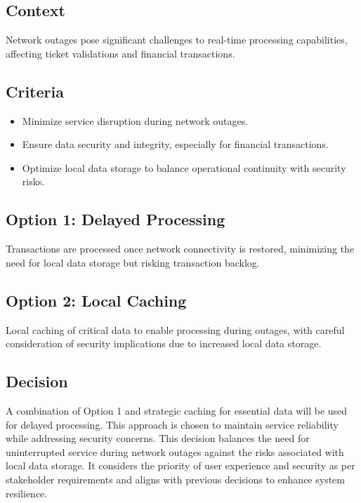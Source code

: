 \subsection*{Context}
Network outages pose significant challenges to real-time processing capabilities, affecting ticket validations and financial transactions.

\subsection*{Criteria}
\begin{itemize}
    \item Minimize service disruption during network outages.
    \item Ensure data security and integrity, especially for financial transactions.
    \item Optimize local data storage to balance operational continuity with security risks.
\end{itemize}

\subsection*{Option 1: Delayed Processing}
Transactions are processed once network connectivity is restored, minimizing the need for local data storage but risking transaction backlog.

\subsection*{Option 2: Local Caching}
Local caching of critical data to enable processing during outages, with careful consideration of security implications due to increased local data storage.

\subsection*{Decision}
A combination of Option 1 and strategic caching for essential data will be used for delayed processing. This approach is chosen to maintain service reliability while addressing security concerns.
This decision balances the need for uninterrupted service during network outages against the risks associated with local data storage. It considers the priority of user experience and security as per stakeholder requirements and aligns with previous decisions to enhance system resilience.

